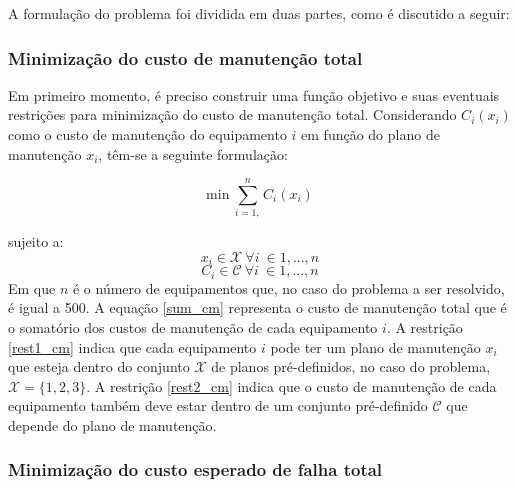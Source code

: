 A formulação do problema foi dividida em duas partes, como é discutido a seguir:

\subsubsection{Minimização do custo de manutenção total} Em primeiro
momento, é preciso construir uma função objetivo e suas eventuais restrições para minimização do custo de manutenção total. Considerando $C_i(x_i)$ como o custo de manutenção do equipamento $i$ em função do plano de manutenção $x_i$, têm-se a seguinte formulação:

\begin{equation}
\mathrm{min}\ \sum_{i=1,}^{n} C_i (x_i) 
\label{sum_cm}
\end{equation}

sujeito a:
\begin{equation}
x_i \in \mathcal{X}\ \forall i\ \in 1, ..., n
\label{rest1_cm}
\end{equation}
\begin{equation}
C_i \in \mathcal{C}\ \forall i\ \in 1, ..., n
\label{rest2_cm}
\end{equation}
Em que $n$ é o número de equipamentos que, no caso do problema a ser resolvido, é igual a 500. A equação \ref{sum_cm} representa o custo de manutenção total que é o somatório dos custos de manutenção de cada equipamento $i$. A restrição \ref{rest1_cm} indica que cada equipamento $i$ pode ter um plano de manutenção $x_i$ que esteja dentro do conjunto $\mathcal{X}$ de planos pré-definidos, no caso do problema, $\mathcal{X} = \{1,2,3\}$. A restrição \ref{rest2_cm} indica que o custo de manutenção de cada equipamento também deve estar dentro de um conjunto pré-definido $\mathcal{C}$ que depende do plano de manutenção.

\subsubsection{Minimização do custo esperado de falha total}